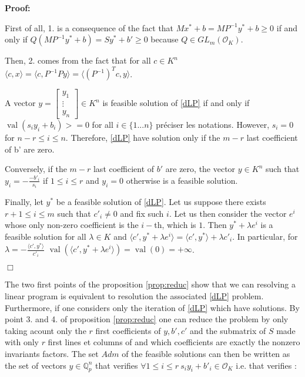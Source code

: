 \documentclass[a4paper,12pt]{article}
\newenvironment{proof}{\hbox{}\vspace{-0.8cm} {\bf Proof:}}{\hfill $\Box$}
\newcommand{\corentin}[1]{{\color{red} #1}} %
\DeclareMathOperator{\val}{val}
\newcommand{\OK}{\mathcal{O}_K}
\begin{document}
\begin{proof}

  First of all, 1. is a consequence of the fact that $Mx^*+b = MP^{-1}y^* +b\geq 0$ if and only if $Q(MP^{-1}y^* + b) = Sy^* + b' \geq 0$ because $Q \in GL_m(\OK)$.

  Then, 2. comes from the fact that for all $c \in K^n$ $\langle c, x\rangle = \langle c, P^{-1}Py \rangle = \langle \left(P^{-1}\right)^T c, y \rangle$.

  A vector $y =  \left[\begin{smallmatrix} y_1 \\ \vdots \\ y_n \end{smallmatrix}\right] \in K^n$ is feasible solution of \ref{dLP} if and only if $\val(s_i y_i + b_i) >=0$ for all $i \in \{1...n\}$ \corentin{préciser les notations}. 
  However, $s_i =0$ for $n-r \leq i\leq n$. Therefore, \ref{dLP} have solution only if the $m-r$ last coefficient of b' are zero.
  
  Conversely, if the $m-r$ last coefficient of $b'$ are zero, the vector $y \in K^n$ such that $y_i = -\frac{-b'_i}{s_i}$ if $1 \leq i \leq r$ and $y_i =0$ otherwise is a feasible solution.

  Finally, let $y^*$ be a feasible solution of \ref{dLP}. Let us suppose there exists $r+1 \leq i \leq m$ such that $c'_i \neq  0$ and fix such $i$. Let us then consider the vector $e^i$ whose only non-zero coefficient is the $i-$th, which is $1$. Then $y^*+\lambda e^i$ is a feasible solution for all $\lambda \in K$ and $\langle c', y^* + \lambda e^i\rangle = \langle c' , y^* \rangle + \lambda c'_i$. In particular, for $\lambda = -\frac{\langle c', y^* \rangle}{c'_i}$ $\val \left( \langle c', y^* + \lambda e ^i \rangle\right) = \val (0) = + \infty$. 

\end{proof}

The two first points of the proposition \ref{prop:reduc} show that we can resolving a linear program is equivalent to resolution the associated \ref{dLP} problem. Furthermore, if one considers only the iteration of \ref{dLP} which have solutions. By point 3. and 4. of proposition \ref{prop:reduc} one can reduce the problem by only taking acount only the $r$ first coefficients of $y, b', c'$ and the submatrix of $S$ made with only $r$ first lines et columns of and which coefficients are exactly the nonzero invariants factors. The set $Adm$ of the feasible solutions can then be written as the set of vectors $y \in \mathbb{Q}_{ p } ^n$ that verifies $\forall 1 \le i\le r \ s_i y_i + b'_i \in \OK$ i.e. that verifies :
\end{document}
